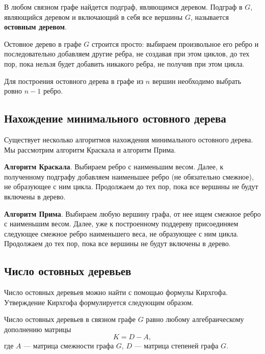 В любом связном графе найдется подграф, являющимся деревом. Подграф в \(G\), являющийся деревом и включающий в себя все вершины \(G\), называется \textbf{остовным деревом}.

Остовное дерево в графе \(G\) строится просто: выбираем произвольное его ребро и последовательно добавляем другие ребра, не создавая при этом циклов, до тех пор, пока нельзя будет добавить никакого ребра, не получив при этом цикла.

Для построения остовного дерева в графе из \(n\) вершин необходимо выбрать ровно \(n - 1\) ребро.

\subsection{Нахождение минимального остовного дерева}

Существует несколько алгоритмов нахождения минимального остовного дерева. Мы рассмотрим алгоритм Краскала и алгоритм Прима.

\textbf{Алгоритм Краскала}. Выбираем ребро с наименьшим весом. Далее, к полученному подграфу добавляем наименьшее ребро (не обязательно смежное), не образующее с ним цикла. Продолжаем до тех пор, пока все вершины не будут включены в дерево.

\textbf{Алгоритм Прима}. Выбираем любую вершину графа, от нее ищем смежное ребро с наименьшим весом. Далее, уже к построенному поддереву присоединяем следующее смежное ребро наименьшего веса, не образующее с ним цикла. Продолжаем до тех пор, пока все вершины не будут включены в дерево.

\subsection{Число остовных деревьев}

Число остовных деревьев можно найти с помощью формулы Кирхгофа. Утверждение Кирхгофа формулируется следующим образом.
\begin{theorem*}
    Число остовных деревьев в связном графе \(G\) равно любому алгебраическому дополнению матрицы
    \[
        K = D - A,
    \]
    где \(A\) --- матрица смежности графа \(G\), \(D\) --- матрица степеней графа \(G\).
\end{theorem*}

